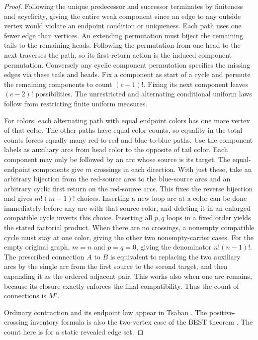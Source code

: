 \documentclass[11pt,reqno]{amsart}
\theoremstyle{definition}
\theoremstyle{remark}
\numberwithin{equation}{section}
\begin{document}
\begin{proof}
Following the unique predecessor and successor terminates by finiteness and acyclicity, giving the entire weak component since an edge to any outside vertex would violate an endpoint condition or uniqueness. Each path uses one fewer edge than vertices. An extending permutation must biject the remaining tails to the remaining heads. Following the permutation from one head to the next traverses the path, so its first-return action is the induced component permutation. Conversely any cyclic component permutation specifies the missing edges via these tails and heads. Fix a component as start of a cycle and permute the remaining components to count $(c-1)!$. Fixing its next component leaves $(c-2)!$ possibilities. The unrestricted and alternating conditional uniform laws follow from restricting finite uniform measures.

For colors, each alternating path with equal endpoint colors has one more vertex of that color. The other paths have equal color counts, so equality in the total counts forces equally many red-to-red and blue-to-blue paths. Use the component labels as auxiliary arcs from head color to the opposite of tail color. Each component may only be followed by an arc whose source is its target. The equal-endpoint components give $m$ crossings in each direction. With just these, take an arbitrary bijection from the red-source arcs to the blue-source arcs and an arbitrary cyclic first return on the red-source arcs. This fixes the reverse bijection and gives $m!(m-1)!$ choices. Inserting a new loop arc at a color can be done immediately before any arc with that source color, and deleting it in an enlarged compatible cycle inverts this choice. Inserting all $p,q$ loops in a fixed order yields the stated factorial product. When there are no crossings, a nonempty compatible cycle must stay at one color, giving the other two nonempty-carrier cases. For the empty original graph, $m=n$ and $p=q=0$, giving the denominator $n!(n-1)!$. The prescribed connection $A$ to $B$ is equivalent to replacing the two auxiliary arcs by the single arc from the first source to the second target, and then expanding it as the ordered adjacent pair. This works also when one arc remains, because its closure exactly enforces the final compatibility. Thus the count of connections is $M'$.

Ordinary contraction and its endpoint law appear in Tsaban \cite[Lemmas 1.1--1.5]{m4:Tsaban}. The positive-crossing inventory formula is also the two-vertex case of the BEST theorem \cite[Theorem 1]{m4:BEST}. The count here is for a static revealed edge set.
\end{proof}
\end{document}
